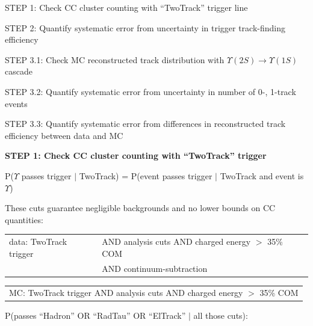 \documentclass[landscape]{article}
\begin{document}
\vfill

STEP 1: Check CC cluster counting with ``TwoTrack'' trigger line

\vspace{1 cm}
STEP 2: Quantify systematic error from uncertainty in trigger
track-finding efficiency

\vspace{1 cm}
STEP 3.1: Check MC reconstructed track distribution with
$\Upsilon(2S) \to \Upsilon(1S)$ cascade

\vspace{1 cm}
STEP 3.2: Quantify systematic error from uncertainty in number of
0-, 1-track events

\vspace{1 cm}
STEP 3.3: Quantify systematic error from differences in
reconstructed track efficiency between data and MC

\vfill

\pagebreak

\vspace{1 cm}

{\bf STEP 1: Check CC cluster counting with ``TwoTrack'' trigger}

\vfill

P($\Upsilon$ passes trigger $|$ TwoTrack) = P(event passes trigger $|$ TwoTrack and event is $\Upsilon$)

\vfill

These cuts guarantee negligible backgrounds and no lower bounds on CC quantities:

\vspace{0.5 cm}

\begin{center}
  \begin{tabular}{l l}
    data: TwoTrack trigger & \hspace{-0.4 cm} AND analysis cuts AND charged energy $>$ 35\% COM \\
    & \hspace{-0.4 cm} AND continuum-subtraction
  \end{tabular}

  \medskip
  \begin{tabular}{l}
    MC: TwoTrack trigger AND analysis cuts AND charged energy $>$ 35\% COM
  \end{tabular}
\end{center}

\vfill

P(passes ``Hadron'' OR ``RadTau'' OR ``ElTrack'' $|$ all those cuts):
\end{document}

